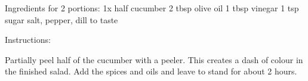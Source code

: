 
Ingredients for 2 portions:
1x half cucumber
2 tbsp olive oil
1 tbsp vinegar
1 tsp sugar
salt, pepper, dill to taste

Instructions:

Partially peel half of the cucumber with a peeler. This creates a dash of colour in the finished salad.
Add the spices and oils and leave to stand for about 2 hours.
